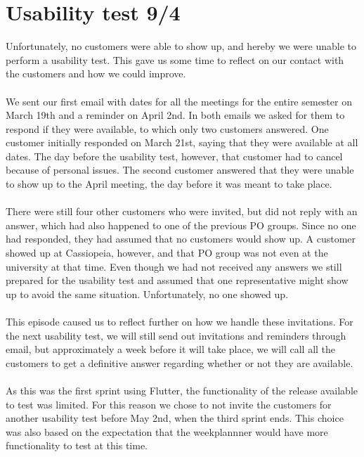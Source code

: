 \section{Usability test 9/4}
Unfortunately, no customers were able to show up, and hereby we were unable to perform a usability test.
This gave us some time to reflect on our contact with the customers and how we could improve.
\\\\
We sent our first email with dates for all the meetings for the entire semester on March 19th and a reminder on April 2nd.
In both emails we asked for them to respond if they were available, to which only two customers answered. 
One customer initially responded on March 21st, saying that they were available at all dates. 
The day before the usability test, however, that customer had to cancel because of personal issues.
The second customer answered that they were unable to show up to the April meeting, the day before it was meant to take place.
\\\\
There were still four other customers who were invited, but did not reply with an answer, which had also happened to one of the previous PO groups.
Since no one had responded, they had assumed that no customers would show up.
A customer showed up at Cassiopeia, however, and that PO group was not even at the university at that time. 
Even though we had not received any answers we still prepared for the usability test and assumed that one representative might show up to avoid the same situation.
Unfortunately, no one showed up.
\\\\
This episode caused us to reflect further on how we handle these invitations.
For the next usability test, we will still send out invitations and reminders through email, but approximately a week before it will take place, we will call all the customers to get a definitive answer regarding whether or not they are available. 
\\\\
As this was the first sprint using Flutter, the functionality of the release available to test was limited. 
For this reason we chose to not invite the customers for another usability test before May 2nd, when the third sprint ends.
This choice was also based on the expectation that the weekplannner would have more functionality to test at this time.

